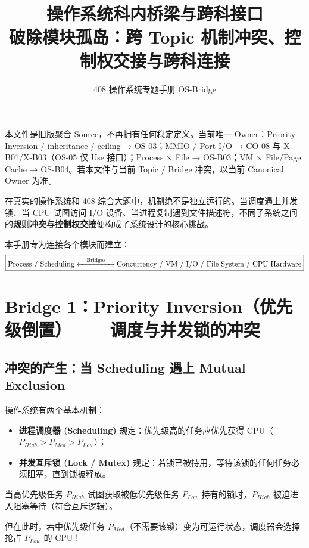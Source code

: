 \documentclass[11pt,a4paper]{ctexart}
\title{\vspace{-1.2cm}\textbf{操作系统科内桥梁与跨科接口}\\[0.4em]
\large 破除模块孤岛：跨 Topic 机制冲突、控制权交接与跨科连接}
\author{408 操作系统专题手册 OS-Bridge}
\date{}
\newcommand{\kw}[1]{\textbf{#1}}
\begin{document}
\maketitle

\begin{warn}
本文件是旧版聚合 Source，不再拥有任何稳定定义。当前唯一 Owner：Priority Inversion / inheritance / ceiling → OS-03；MMIO / Port I/O → CO-08 与 X-B01/X-B03（OS-05 仅 Use 接口）；Process × File → OS-B03；VM × File/Page Cache → OS-B04。若本文件与当前 Topic / Bridge 冲突，以当前 Canonical Owner 为准。
\end{warn}

\begin{corebox}
在真实的操作系统和 408 综合大题中，机制绝不是独立运行的。当调度遇上并发锁、当 CPU 试图访问 I/O 设备、当进程复制遇到文件描述符，不同子系统之间的\kw{规则冲突与控制权交接}便构成了系统设计的核心挑战。

本手册专为连接各个模块而建立：
\[
\boxed{
\text{Process / Scheduling}
\xleftrightarrow{\quad\text{Bridges}\quad}
\text{Concurrency / VM / I/O / File System / CPU Hardware}
}
\]
\end{corebox}

\tableofcontents
\newpage

\section{Bridge 1：Priority Inversion（优先级倒置）——调度与并发锁的冲突}

\subsection{冲突的产生：当 Scheduling 遇上 Mutual Exclusion}

操作系统有两个基本机制：
\begin{itemize}
  \item \kw{进程调度器 (Scheduling)} 规定：优先级高的任务应优先获得 CPU（$P_{High} > P_{Med} > P_{Low}$）；
  \item \kw{并发互斥锁 (Lock / Mutex)} 规定：若锁已被持用，等待该锁的任何任务必须阻塞，直到锁被释放。
\end{itemize}

当高优先级任务 $P_{High}$ 试图获取被低优先级任务 $P_{Low}$ 持有的锁时，$P_{High}$ 被迫进入阻塞等待（符合互斥逻辑）。

但在此时，若中优先级任务 $P_{Med}$（不需要该锁）变为可运行状态，调度器会选择抢占 $P_{Low}$ 的 CPU！
\end{document}
